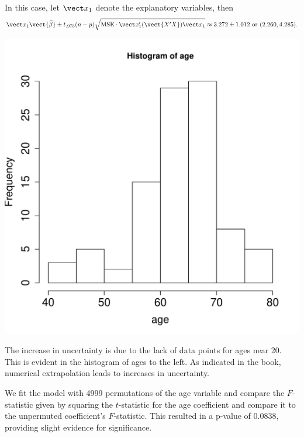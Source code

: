 \documentclass{homework}
\begin{document}

In this case, let $\vect x_1$ denote the explanatory variables, then
$$
  \vect x_1 \vect{\hat \beta} \pm t_{.975}(n-p)\sqrt{\MSE\cdot\vect x_1'(\vect{X'X})\vect x_1} \approx 3.272 \pm 1.012
\text{ or }
( 2.260, 4.285 ). $$


\begin{minipage}{.3\textwidth}
\includegraphics[width=\textwidth]{age_hist.pdf}
\end{minipage}
\begin{minipage}{.7\textwidth}
The increase in uncertainty is due to the lack of data points for ages near 20.  This is evident in the histogram of ages to the left.  As indicated in the book, numerical extrapolation leads to increases in uncertainty.
\end{minipage}


We fit the model with 4999 permutations of the age variable and compare the $F$-statistic given by squaring the $t$-statistic for the age coefficient and compare it to the unpermuted coefficient's $F$-statistic.
This resulted in a p-value of 0.0838, providing slight evidence for significance.
\end{document}
